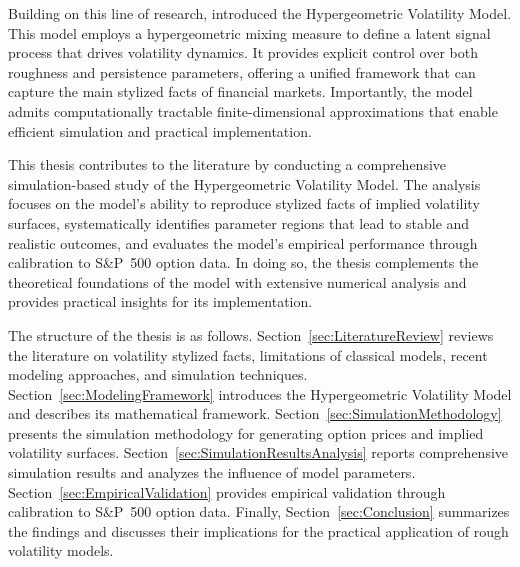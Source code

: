 Building on this line of research, \cite{Damian2021} introduced the Hypergeometric Volatility Model. This model employs a hypergeometric mixing measure to define a latent signal process that drives volatility dynamics. It provides explicit control over both roughness and persistence parameters, offering a unified framework that can capture the main stylized facts of financial markets. Importantly, the model admits computationally tractable finite-dimensional approximations that enable efficient simulation and practical implementation.

This thesis contributes to the literature by conducting a comprehensive simulation-based study of the Hypergeometric Volatility Model. The analysis focuses on the model's ability to reproduce stylized facts of implied volatility surfaces, systematically identifies parameter regions that lead to stable and realistic outcomes, and evaluates the model's empirical performance through calibration to S\&P~500 option data. In doing so, the thesis complements the theoretical foundations of the model with extensive numerical analysis and provides practical insights for its implementation.

The structure of the thesis is as follows. Section~\ref{sec:LiteratureReview} reviews the literature on volatility stylized facts, limitations of classical models, recent modeling approaches, and simulation techniques. Section~\ref{sec:ModelingFramework} introduces the Hypergeometric Volatility Model and describes its mathematical framework. Section~\ref{sec:SimulationMethodology} presents the simulation methodology for generating option prices and implied volatility surfaces. Section~\ref{sec:SimulationResultsAnalysis} reports comprehensive simulation results and analyzes the influence of model parameters. Section~\ref{sec:EmpiricalValidation} provides empirical validation through calibration to S\&P~500 option data. Finally, Section~\ref{sec:Conclusion} summarizes the findings and discusses their implications for the practical application of rough volatility models.